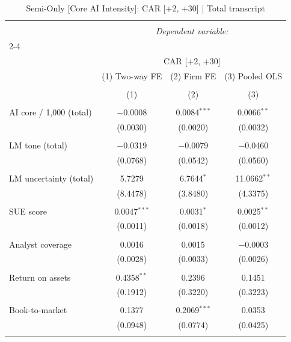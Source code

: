 
\begin{table}[!htbp] \centering 
  \caption{Semi-Only [Core AI Intensity]: CAR [+2, +30]  |  Total transcript} 
  \label{} 
\begin{tabular}{@{\extracolsep{5pt}}lccc} 
\\[-1.8ex]\hline 
\hline \\[-1.8ex] 
 & \multicolumn{3}{c}{\textit{Dependent variable:}} \\ 
\cline{2-4} 
\\[-1.8ex] & \multicolumn{3}{c}{CAR [+2, +30]} \\ 
 & (1) Two-way FE & (2) Firm FE & (3) Pooled OLS \\ 
\\[-1.8ex] & (1) & (2) & (3)\\ 
\hline \\[-1.8ex] 
 AI core / 1,000 (total) & $-$0.0008 & 0.0084$^{***}$ & 0.0066$^{**}$ \\ 
  & (0.0030) & (0.0020) & (0.0032) \\ 
  & & & \\ 
 LM tone (total) & $-$0.0319 & $-$0.0079 & $-$0.0460 \\ 
  & (0.0768) & (0.0542) & (0.0560) \\ 
  & & & \\ 
 LM uncertainty (total) & 5.7279 & 6.7644$^{*}$ & 11.0662$^{**}$ \\ 
  & (8.4478) & (3.8480) & (4.3375) \\ 
  & & & \\ 
 SUE score & 0.0047$^{***}$ & 0.0031$^{*}$ & 0.0025$^{**}$ \\ 
  & (0.0011) & (0.0018) & (0.0012) \\ 
  & & & \\ 
 Analyst coverage & 0.0016 & 0.0015 & $-$0.0003 \\ 
  & (0.0028) & (0.0033) & (0.0026) \\ 
  & & & \\ 
 Return on assets & 0.4358$^{**}$ & 0.2396 & 0.1451 \\ 
  & (0.1912) & (0.3220) & (0.3223) \\ 
  & & & \\ 
 Book-to-market & 0.1377 & 0.2069$^{***}$ & 0.0353 \\ 
  & (0.0948) & (0.0774) & (0.0425) \\ 
  & & & \\ 

\end{tabular}
\end{table}
